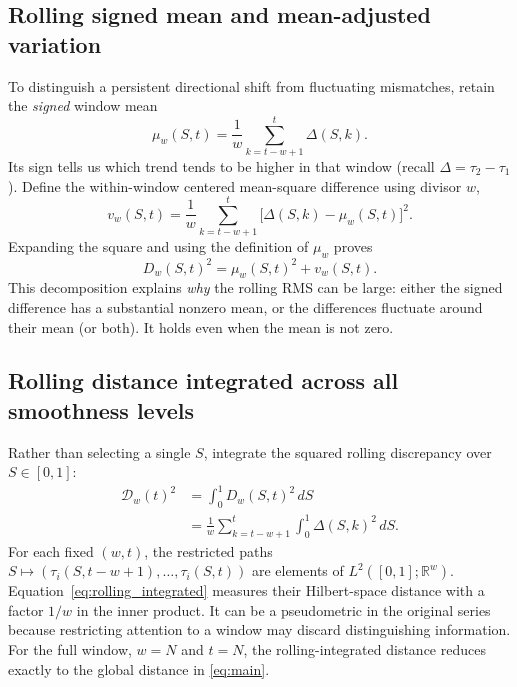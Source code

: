 \documentclass[10pt,letterpaper]{article}
\newcommand{\R}{\mathbb{R}}
\begin{document}
\subsection{Rolling signed mean and mean-adjusted variation}
\label{sec:rolling_mean}
To distinguish a persistent directional shift from fluctuating
mismatches, retain the \emph{signed} window mean
\begin{equation}\label{eq:rolling_mean}
  \mu_w(S,t)=\frac1w\sum_{k=t-w+1}^{t}\Delta(S,k).
\end{equation}
Its sign tells us which trend tends to be higher in that window
(recall $\Delta=\tau_2-\tau_1$). Define the within-window centered
mean-square difference using divisor $w$,
\begin{equation}\label{eq:rolling_variation}
  v_w(S,t)=\frac1w\sum_{k=t-w+1}^{t}
              \bigl[\Delta(S,k)-\mu_w(S,t)\bigr]^2.
\end{equation}
Expanding the square and using the definition of $\mu_w$ proves
\begin{equation}\label{eq:rolling_decomp}
  D_w(S,t)^2=\mu_w(S,t)^2+v_w(S,t).
\end{equation}
This decomposition explains \emph{why} the rolling RMS can be large:
either the signed difference has a substantial nonzero mean, or the
differences fluctuate around their mean (or both). It holds even
when the mean is not zero.

\subsection{Rolling distance integrated across all smoothness levels}
Rather than selecting a single $S$, integrate the squared rolling
discrepancy over $S\in[0,1]$:
\begin{equation}\label{eq:rolling_integrated}
\begin{aligned}
\mathcal D_w(t)^2
 &=\int_0^1 D_w(S,t)^2\,dS\\
 &=\frac1w\sum_{k=t-w+1}^{t}\int_0^1
 \Delta(S,k)^2\,dS.
\end{aligned}
\end{equation}
For each fixed $(w,t)$, the restricted paths
$S\mapsto(\tau_i(S,t-w+1),\ldots,\tau_i(S,t))$ are elements of
$L^2([0,1];\R^w)$. Equation~\eqref{eq:rolling_integrated}
measures their Hilbert-space distance with a factor $1/w$ in the inner
product. It can be a pseudometric in the original series because
restricting attention to a window may discard distinguishing information.
For the full window, $w=N$ and $t=N$, the rolling-integrated distance
reduces exactly to the global distance in \eqref{eq:main}.
\end{document}
